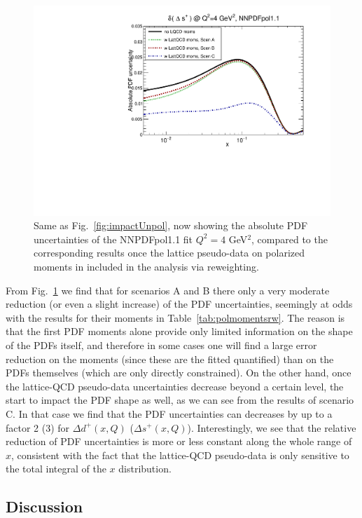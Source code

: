 \begin{figure}[!t]
\includegraphics[scale=0.45]{plots/xsp-pol-lattice-relerr.pdf}
\caption{\small Same as Fig.~\ref{fig:impactUnpol}, now
  showing the absolute PDF uncertainties of the NNPDFpol1.1 fit
   $Q^2=4$ GeV$^2$,
  compared to the corresponding results once the lattice pseudo-data
  on polarized moments in included in the analysis via
  reweighting.
}    
\label{fig:impactPol}
\end{figure}

From Fig.~\ref{fig:impactPol} we find that for scenarios
A and B there only a very moderate reduction (or even a slight increase)
of the PDF uncertainties, seemingly at odds with the results
for their moments in Table~\ref{tab:polmomentsrw}.
%
The reason is that the first PDF moments alone provide only limited
information on the shape of the PDFs itself, and therefore in some
cases one will find a large error reduction on the moments (since these
are the fitted quantified) than on the PDFs themselves (which are
only directly constrained).
%
On the other hand, once the lattice-QCD pseudo-data uncertainties
decrease beyond a certain level, the start to impact the PDF shape
as well, as we can see from the results of scenario C.
%
In that case we find that the PDF uncertainties can decreases by up to a factor
2 (3) for $\Delta d^+(x,Q)$ ($\Delta s^+(x,Q)$).
%
Interestingly, we see that the relative reduction of PDF uncertainties is more
or less constant along the whole range of $x$, consistent with the fact that
the lattice-QCD pseudo-data is only sensitive to the total integral
of the $x$ distribution.

\subsection{Discussion}

